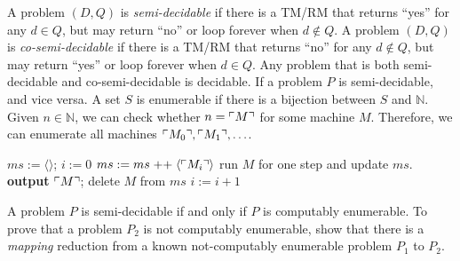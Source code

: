  A problem $(D,Q)$ is \emph{semi-decidable} if there is a TM/RM that returns ``yes'' for any $d \in Q$, but may return ``no'' or loop forever when $d \notin Q$.
 A problem $(D, Q)$ is \emph{co-semi-decidable} if there is a TM/RM that returns ``no'' for any $d \notin Q$, but may return ``yes'' or loop forever when $d \in Q$.
 Any problem that is both semi-decidable and co-semi-decidable is decidable.
 If a problem $P$ is semi-decidable, and vice versa.
 A set $S$ is enumerable if there is a bijection between $S$ and $\mathbb{N}$.
 Given $n \in \mathbb{N}$, we can check whether $n = \ulcorner M \urcorner$ for some machine $M$. Therefore, we can enumerate all machines $\ulcorner M_0 \urcorner,\ulcorner M_1 \urcorner,\ldots$.
\begin{algorithmic}
    \State $ms := \langle\rangle$; $i := 0$
        \State $ms := ms \mathrel{++} \langle\ulcorner M_i \urcorner\rangle$
            \State run $M$ for one step and update $ms$.
                \State \textbf{output} $\ulcorner M \urcorner$; delete $M$ from $ms$
            \EndIf
        \EndFor
        \State $i := i+1$
    \EndWhile
\end{algorithmic}
 A problem $P$ is semi-decidable if and only if $P$ is computably enumerable.
 To prove that a problem $P_2$ is not computably enumerable, show that there is a \emph{mapping} reduction from a known not-computably enumerable problem $P_1$ to $P_2$.
